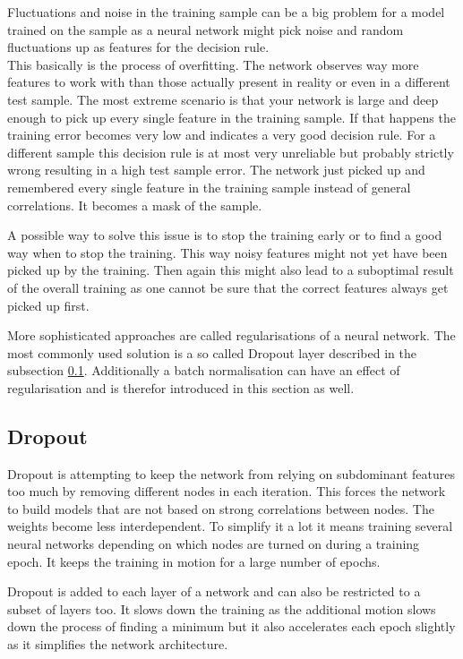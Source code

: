 Fluctuations and noise in the training sample can be a big problem for a model trained on the sample as a neural network might pick noise and random fluctuations up as features for the decision rule.\\
This basically is the process of overfitting. The network observes way more features to work with than those actually present in reality or even in a different test sample. The most extreme scenario is that your network is large and deep enough to pick up every single feature in the training sample. If that happens the training error becomes very low and indicates a very good decision rule. For a different sample this decision rule is at most very unreliable but probably strictly wrong resulting in a high test sample error. The network just picked up and remembered every single feature in the training sample instead of general correlations. It becomes a mask of the sample.

A possible way to solve this issue is to stop the training early or to find a good way when to stop the training. This way noisy features might not yet have been picked up by the training. Then again this might also lead to a suboptimal result of the overall training as one cannot be sure that the correct features always get picked up first.

More sophisticated approaches are called regularisations of a neural network. The most commonly used solution is a so called Dropout layer described in the subsection \ref{sec:dropout}. Additionally a batch normalisation can have an effect of regularisation and is therefor introduced in this section as well.

\subsection{Dropout}
\label{sec:dropout}

Dropout is attempting to keep the network from relying on subdominant features too much by removing different nodes in each iteration. This forces the network to build models that are not based on strong correlations between nodes. The weights become less interdependent. To simplify it a lot it means training several neural networks depending on which nodes are turned on during a training epoch. It keeps the training in motion for a large number of epochs.

Dropout is added to each layer of a network and can also be  restricted to a subset of layers too. It slows down the training as the additional motion slows down the process of finding a minimum but it also accelerates each epoch slightly as it simplifies the network architecture. 

